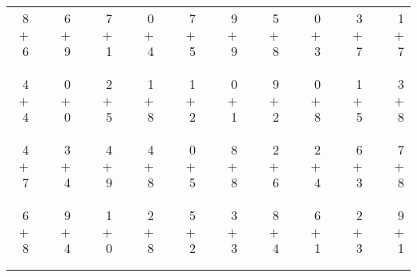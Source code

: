 \documentclass[12pt, letterpaper]{article}
\begin{document}
\begin{tabular}{rrrrrrrrrrrrrrrrrrr}
8 & & 6 & & 7 & & 0 & & 7 & & 9 & & 5 & & 0 & & 3 & & 1\\
$+$ 6 & & $+$ 9 & & $+$ 1 & & $+$ 4 & & $+$ 5 & & $+$ 9 & & $+$ 8 & & $+$ 3 & & $+$ 7 & & $+$ 7\\
\cline{1-1} \cline{3-3} \cline{5-5} \cline{7-7} \cline{9-9} \cline{11-11} \cline{13-13} \cline{15-15} \cline{17-17} \cline{19-19} \\ \\
4 & & 0 & & 2 & & 1 & & 1 & & 0 & & 9 & & 0 & & 1 & & 3\\
$+$ 4 & & $+$ 0 & & $+$ 5 & & $+$ 8 & & $+$ 2 & & $+$ 1 & & $+$ 2 & & $+$ 8 & & $+$ 5 & & $+$ 8\\
\cline{1-1} \cline{3-3} \cline{5-5} \cline{7-7} \cline{9-9} \cline{11-11} \cline{13-13} \cline{15-15} \cline{17-17} \cline{19-19} \\ \\
4 & & 3 & & 4 & & 4 & & 0 & & 8 & & 2 & & 2 & & 6 & & 7\\
$+$ 7 & & $+$ 4 & & $+$ 9 & & $+$ 8 & & $+$ 5 & & $+$ 8 & & $+$ 6 & & $+$ 4 & & $+$ 3 & & $+$ 8\\
\cline{1-1} \cline{3-3} \cline{5-5} \cline{7-7} \cline{9-9} \cline{11-11} \cline{13-13} \cline{15-15} \cline{17-17} \cline{19-19} \\ \\
6 & & 9 & & 1 & & 2 & & 5 & & 3 & & 8 & & 6 & & 2 & & 9\\
$+$ 8 & & $+$ 4 & & $+$ 0 & & $+$ 8 & & $+$ 2 & & $+$ 3 & & $+$ 4 & & $+$ 1 & & $+$ 3 & & $+$ 1\\
\cline{1-1} \cline{3-3} \cline{5-5} \cline{7-7} \cline{9-9} \cline{11-11} \cline{13-13} \cline{15-15} \cline{17-17} \cline{19-19} \\ \\
\end{tabular}
\newpage
\end{document}
